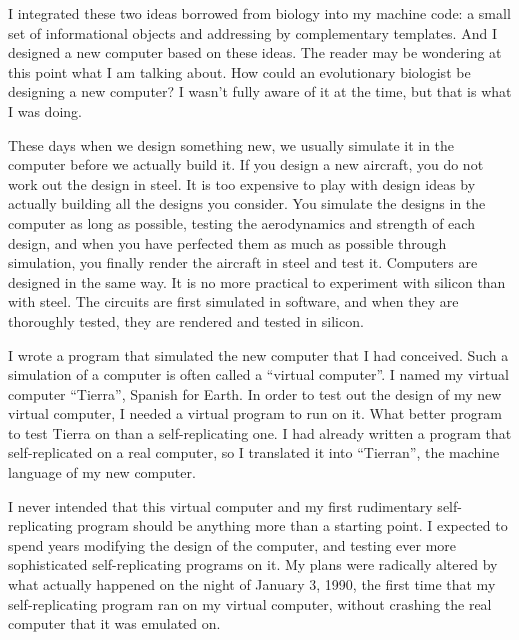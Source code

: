 

I integrated these two ideas borrowed from biology into my machine code:
a small set of informational objects and addressing by complementary templates.
And I designed a new computer based on these ideas.  The reader may be
wondering at this point what I am talking about.  How could an evolutionary
biologist be designing a new computer?  I wasn't fully aware of it at the
time, but that is what I was doing.

These days when we design something new, we usually simulate it in the
computer before we actually build it.  If you design a new aircraft, you do
not work out the design in steel.  It is too expensive to play with design
ideas by actually building all the designs you consider.  You simulate the
designs in the computer as long as possible, testing the aerodynamics and
strength of each design, and when you have perfected them as much as possible
through simulation, you finally render the aircraft in steel and test it.
Computers are designed in the same way.  It is no more practical to experiment
with silicon than with steel.  The circuits are first simulated in software,
and when they are thoroughly tested, they are rendered and tested in silicon.

I wrote a program that simulated the new computer that I
had conceived.  Such a simulation of a computer is often called a
``virtual computer''.  I named my virtual computer ``Tierra'', Spanish for
Earth.  In order to test out the design of my new virtual computer, I needed
a virtual program to run on it.  What better program to test Tierra on than
a self-replicating one.  I had already written a program that self-replicated
on a real computer, so I translated it into ``Tierran'', the machine
language of my new computer.

I never intended that this virtual computer and my first rudimentary
self-replicating program should be anything more than a starting point.
I expected to spend years modifying the design of the computer, and testing
ever more sophisticated self-replicating programs on it.  My plans were
radically altered by what actually happened on the night of January 3, 1990,
the first time that my self-replicating program ran on my virtual computer,
without crashing the real computer that it was emulated on.

